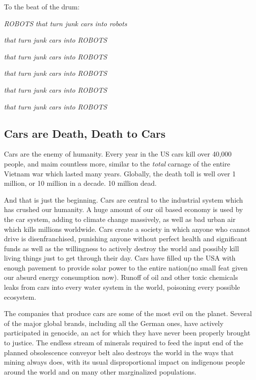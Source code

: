 To the beat of the drum:

\emph{ROBOTS that turn junk cars into robots}

\emph{that turn junk cars into ROBOTS}

\emph{that turn junk cars into ROBOTS}

\emph{that turn junk cars into ROBOTS}

\emph{that turn junk cars into ROBOTS}

\emph{that turn junk cars into ROBOTS}

\subsection{Cars are Death, Death to
Cars}\label{cars-are-death-death-to-cars}

Cars are the enemy of humanity. Every year in the US cars kill over
40,000 people, and maim countless more, similar to the \emph{total}
carnage of the entire Vietnam war which lasted many years. Globally, the
death toll is well over 1 million, or 10 million in a decade. 10 million
dead.

And that is just the beginning. Cars are central to the industrial
system which has crushed our humanity. A huge amount of our oil based
economy is used by the car system, adding to climate change massively,
as well as bad urban air which kills millions worldwide. Cars create a
society in which anyone who cannot drive is disenfranchised, punishing
anyone without perfect health and significant funds as well as the
willingness to actively destroy the world and possibly kill living
things just to get through their day. Cars have filled up the USA with
enough pavement to provide solar power to the entire nation(no small
feat given our absurd energy consumption now). Runoff of oil and other
toxic chemicals leaks from cars into every water system in the world,
poisoning every possible ecosystem.

The companies that produce cars are some of the most evil on the planet.
Several of the major global brands, including all the German ones, have
actively participated in genocide, an act for which they have never been
properly brought to justice. The endless stream of minerals required to
feed the input end of the planned obsolescence conveyor belt also
destroys the world in the ways that mining always does, with its usual
disproportional impact on indigenous people around the world and on many
other marginalized populations.

